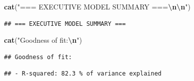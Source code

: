 \documentclass[
]{article}
\newenvironment{Shaded}{\begin{snugshade}}{\end{snugshade}}
\newcommand{\DecValTok}[1]{\textcolor[rgb]{0.00,0.00,0.81}{#1}}
\newcommand{\FunctionTok}[1]{\textcolor[rgb]{0.13,0.29,0.53}{\textbf{#1}}}
\newcommand{\NormalTok}[1]{#1}
\newcommand{\SpecialCharTok}[1]{\textcolor[rgb]{0.81,0.36,0.00}{\textbf{#1}}}
\newcommand{\StringTok}[1]{\textcolor[rgb]{0.31,0.60,0.02}{#1}}
\begin{document}
\begin{Shaded}
\begin{Highlighting}[]
\FunctionTok{cat}\NormalTok{(}\StringTok{"=== EXECUTIVE MODEL SUMMARY ===}\SpecialCharTok{\textbackslash{}n\textbackslash{}n}\StringTok{"}\NormalTok{)}
\end{Highlighting}
\end{Shaded}

\begin{verbatim}
## === EXECUTIVE MODEL SUMMARY ===
\end{verbatim}

\begin{Shaded}
\begin{Highlighting}[]
\FunctionTok{cat}\NormalTok{(}\StringTok{"Goodness of fit:}\SpecialCharTok{\textbackslash{}n}\StringTok{"}\NormalTok{)}
\end{Highlighting}
\end{Shaded}

\begin{verbatim}
## Goodness of fit:
\end{verbatim}

\begin{Shaded}
\end{Shaded}

\begin{verbatim}
## - R-squared: 82.3 % of variance explained
\end{verbatim}

\begin{Shaded}
\end{Shaded}
\end{document}
